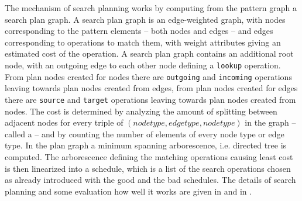 The mechanism of search planning works by computing from the pattern graph a search plan graph.
A search plan graph is an edge-weighted graph, with nodes corresponding to the pattern elements -- both nodes and edges -- and edges corresponding to operations to match them, with weight attributes giving an estimated cost of the operation. 
A search plan graph contains an additional root node, with an outgoing edge to each other node defining a \texttt{lookup} operation. From plan nodes created for nodes there are \texttt{outgoing} and \texttt{incoming} operations leaving towards plan nodes created from edges, from plan nodes created for edges there are \texttt{source} and \texttt{target} operations leaving towards plan nodes created from nodes.
The cost is determined by analyzing the amount of splitting between adjacent nodes for every triple of $(node type, edge type, node type)$ in the graph -- called a  -- and by counting the number of elements of every node type or edge type.
In the plan graph a minimum spanning arborescence, i.e. directed tree is computed. 
The arborescence defining the matching operations causing least cost is then linearized into a schedule, which is a list of the search operations chosen as already introduced with the good and the bad schedules.
The details of search planning and some evaluation how well it works are given in \cite{searchplangrgen} and in \cite{BKG:07}.

